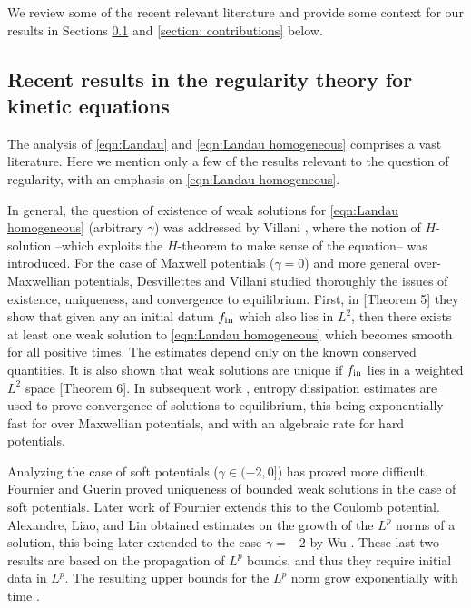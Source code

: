 \documentclass[12pt,american]{amsart}
\numberwithin{equation}{section}
\theoremstyle{plain}
\theoremstyle{definition}                  %
\def\fin{f_{\textnormal{in}}}
\begin{document}
We review some of the recent relevant literature and provide some context for our results in Sections \ref{section: literature review} and \ref{section: contributions} below.

\subsection{Recent results in the regularity theory for kinetic equations}\label{section: literature review} The analysis of \eqref{eqn:Landau} and \eqref{eqn:Landau homogeneous} comprises a vast literature. Here we mention only a few of the results relevant to the question of regularity, with an emphasis on \eqref{eqn:Landau homogeneous}.

In general, the question of existence of weak solutions for \eqref{eqn:Landau homogeneous} (arbitrary $\gamma$) was addressed by Villani \cite{V98}, where the notion of $H$-solution --which exploits the $H$-theorem to make sense of the equation-- was introduced.  For the case of Maxwell potentials ($\gamma= 0$) and more general over-Maxwellian potentials, Desvillettes and Villani \cite{DesVil2000a,DesVil2000b} studied thoroughly the issues of existence, uniqueness, and convergence to equilibrium. First,  in \cite{DesVil2000a}[Theorem 5] they show that given any an initial datum $\fin$ which also lies in $L^2$, then there exists at least one weak solution to \eqref{eqn:Landau homogeneous} which becomes smooth for all positive times. The estimates depend only on the known conserved quantities. It is also shown that weak solutions are unique if $\fin$ lies in a weighted $L^2$ space  \cite{DesVil2000a}[Theorem 6]. In subsequent work \cite{DesVil2000b}, entropy dissipation estimates are used to prove  convergence of solutions to equilibrium, this being exponentially fast for over Maxwellian potentials, and with an algebraic rate for hard potentials. 

Analyzing the case of soft potentials ($\gamma \in (-2,0]$) has proved more difficult. Fournier and Guerin \cite{FournierGuerin2009} proved uniqueness of bounded weak solutions in the case of soft potentials. Later work of Fournier \cite{Fournier2010} extends this to the Coulomb potential.  Alexandre, Liao, and Lin  \cite{AleLinLia2013} obtained estimates on the growth of the $L^p$ norms of a solution, this being later extended to the case $\gamma=-2$ by Wu \cite{Wu13}. These last two results are based on the propagation of $L^p$ bounds, and thus they require initial data in $L^p$. The resulting upper bounds for the $L^p$ norm grow exponentially with time \cite{AleLinLia2013,Wu13}.
\end{document}
